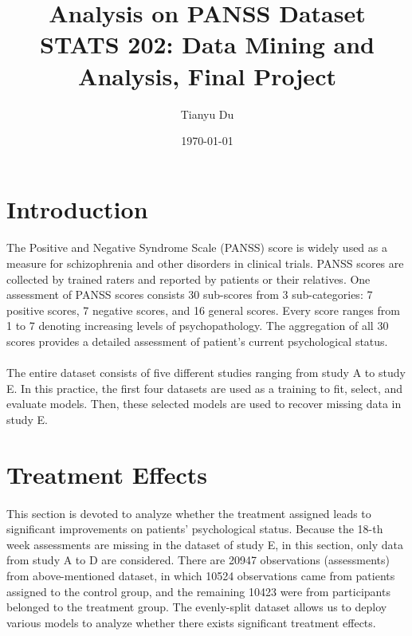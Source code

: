 \documentclass[11pt]{article}
\title{Analysis on PANSS Dataset\\ \small STATS 202: Data Mining and Analysis, Final Project}
\author{Tianyu Du}
\date{\today}
\begin{document}
	\maketitle
	\tableofcontents
	\newpage

	\section{Introduction}
	\paragraph{}The Positive and Negative Syndrome Scale (PANSS) score is widely used as a measure for schizophrenia and other disorders in clinical trials. PANSS scores are collected by trained raters and reported by patients or their relatives. One assessment of PANSS scores consists 30 sub-scores from 3 sub-categories: 7 positive scores, 7 negative scores, and 16 general scores. Every score ranges from 1 to 7 denoting increasing levels of psychopathology. The aggregation of all 30 scores provides a detailed assessment of patient's current psychological status.
	
	\paragraph{}The entire dataset consists of five different studies ranging from study A to study E. In this practice, the first four datasets are used as a training to fit, select, and evaluate models. Then, these selected models are used to recover missing data in study E.
	
	\section{Treatment Effects}
	\paragraph{}This section is devoted to analyze whether the treatment assigned leads to significant improvements on patients' psychological status. Because the 18-th week assessments are missing in the dataset of study E, in this section, only data from study A to D are considered. There are 20947 observations (assessments) from above-mentioned dataset, in which 10524 observations came from patients assigned to the control group, and the remaining 10423 were from participants belonged to the treatment group. The evenly-split dataset allows us to deploy various models to analyze whether there exists significant treatment effects.
	
\end{document}
